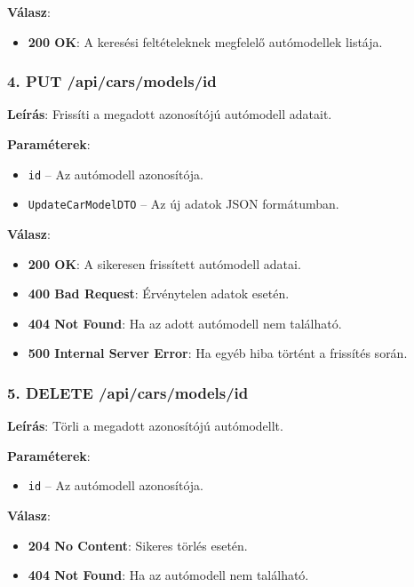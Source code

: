 \documentclass{report}[11pt]
\begin{document}
\textbf{Válasz}:  
\begin{itemize}
    \item \textbf{200 OK}: A keresési feltételeknek megfelelő autómodellek listája.
\end{itemize}

\subsubsection{4. PUT /api/cars/models/{id}}

\textbf{Leírás}:  
Frissíti a megadott azonosítójú autómodell adatait.

\textbf{Paraméterek}:  
\begin{itemize}
    \item \texttt{id} – Az autómodell azonosítója.
    \item \texttt{UpdateCarModelDTO} – Az új adatok JSON formátumban.
\end{itemize}

\textbf{Válasz}:  
\begin{itemize}
    \item \textbf{200 OK}: A sikeresen frissített autómodell adatai.
    \item \textbf{400 Bad Request}: Érvénytelen adatok esetén.
    \item \textbf{404 Not Found}: Ha az adott autómodell nem található.
    \item \textbf{500 Internal Server Error}: Ha egyéb hiba történt a frissítés során.
\end{itemize}

\subsubsection{5. DELETE /api/cars/models/{id}}

\textbf{Leírás}:  
Törli a megadott azonosítójú autómodellt.

\textbf{Paraméterek}:  
\begin{itemize}
    \item \texttt{id} – Az autómodell azonosítója.
\end{itemize}

\textbf{Válasz}:  
\begin{itemize}
    \item \textbf{204 No Content}: Sikeres törlés esetén.
    \item \textbf{404 Not Found}: Ha az autómodell nem található.
\end{itemize}
\end{document}
